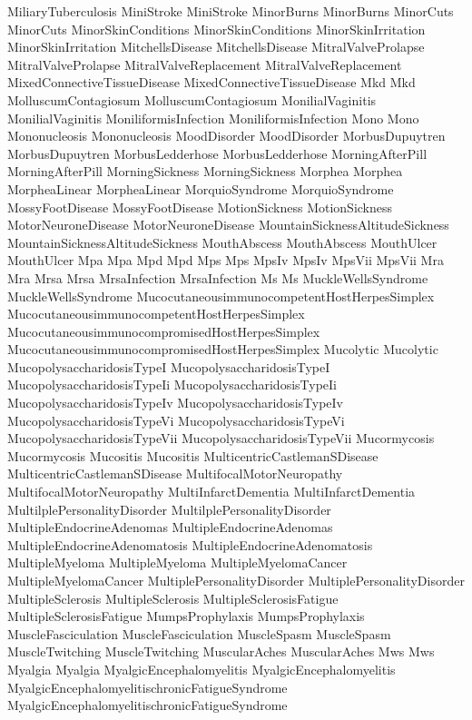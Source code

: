  MiliaryTuberculosis
 MiniStroke
 MiniStroke
 MinorBurns
 MinorBurns
 MinorCuts
 MinorCuts
 MinorSkinConditions
 MinorSkinConditions
 MinorSkinIrritation
 MinorSkinIrritation
 MitchellsDisease
 MitchellsDisease
 MitralValveProlapse
 MitralValveProlapse
 MitralValveReplacement
 MitralValveReplacement
 MixedConnectiveTissueDisease
 MixedConnectiveTissueDisease
 Mkd
 Mkd
 MolluscumContagiosum
 MolluscumContagiosum
 MonilialVaginitis
 MonilialVaginitis
 MoniliformisInfection
 MoniliformisInfection
 Mono
 Mono
 Mononucleosis
 Mononucleosis
 MoodDisorder
 MoodDisorder
 MorbusDupuytren
 MorbusDupuytren
 MorbusLedderhose
 MorbusLedderhose
 MorningAfterPill
 MorningAfterPill
 MorningSickness
 MorningSickness
 Morphea
 Morphea
 MorpheaLinear
 MorpheaLinear
 MorquioSyndrome
 MorquioSyndrome
 MossyFootDisease
 MossyFootDisease
 MotionSickness
 MotionSickness
 MotorNeuroneDisease
 MotorNeuroneDisease
 MountainSicknessAltitudeSickness
 MountainSicknessAltitudeSickness
 MouthAbscess
 MouthAbscess
 MouthUlcer
 MouthUlcer
 Mpa
 Mpa
 Mpd
 Mpd
 Mps
 Mps
 MpsIv
 MpsIv
 MpsVii
 MpsVii
 Mra
 Mra
 Mrsa
 Mrsa
 MrsaInfection
 MrsaInfection
 Ms
 Ms
 MuckleWellsSyndrome
 MuckleWellsSyndrome
 MucocutaneousimmunocompetentHostHerpesSimplex
 MucocutaneousimmunocompetentHostHerpesSimplex
 MucocutaneousimmunocompromisedHostHerpesSimplex
 MucocutaneousimmunocompromisedHostHerpesSimplex
 Mucolytic
 Mucolytic
 MucopolysaccharidosisTypeI
 MucopolysaccharidosisTypeI
 MucopolysaccharidosisTypeIi
 MucopolysaccharidosisTypeIi
 MucopolysaccharidosisTypeIv
 MucopolysaccharidosisTypeIv
 MucopolysaccharidosisTypeVi
 MucopolysaccharidosisTypeVi
 MucopolysaccharidosisTypeVii
 MucopolysaccharidosisTypeVii
 Mucormycosis
 Mucormycosis
 Mucositis
 Mucositis
 MulticentricCastlemanSDisease
 MulticentricCastlemanSDisease
 MultifocalMotorNeuropathy
 MultifocalMotorNeuropathy
 MultiInfarctDementia
 MultiInfarctDementia
 MultilplePersonalityDisorder
 MultilplePersonalityDisorder
 MultipleEndocrineAdenomas
 MultipleEndocrineAdenomas
 MultipleEndocrineAdenomatosis
 MultipleEndocrineAdenomatosis
 MultipleMyeloma
 MultipleMyeloma
 MultipleMyelomaCancer
 MultipleMyelomaCancer
 MultiplePersonalityDisorder
 MultiplePersonalityDisorder
 MultipleSclerosis
 MultipleSclerosis
 MultipleSclerosisFatigue
 MultipleSclerosisFatigue
 MumpsProphylaxis
 MumpsProphylaxis
 MuscleFasciculation
 MuscleFasciculation
 MuscleSpasm
 MuscleSpasm
 MuscleTwitching
 MuscleTwitching
 MuscularAches
 MuscularAches
 Mws
 Mws
 Myalgia
 Myalgia
 MyalgicEncephalomyelitis
 MyalgicEncephalomyelitis
 MyalgicEncephalomyelitischronicFatigueSyndrome
 MyalgicEncephalomyelitischronicFatigueSyndrome
